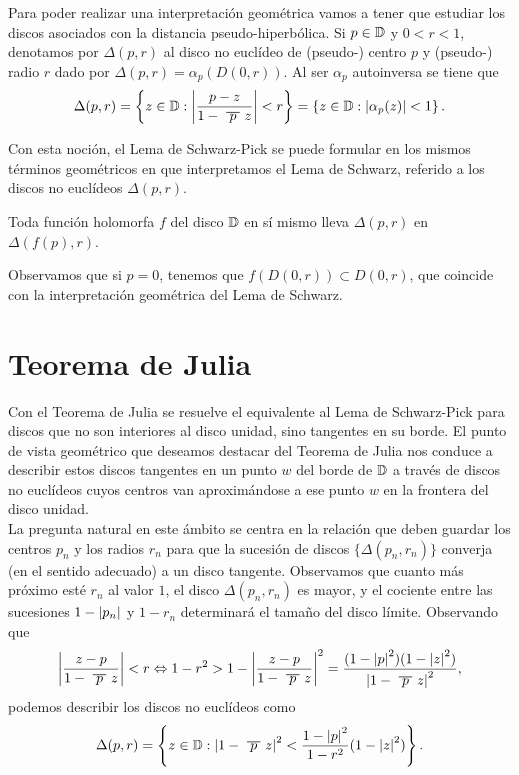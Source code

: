 Para poder realizar una interpretación geométrica vamos a tener que estudiar los discos asociados con la distancia pseudo-hiperbólica. Si $p \in \mathbb{D}$ y $0 < r < 1$, denotamos por $\Delta(p,r)$ al disco no euclídeo de (pseudo-) centro $p$ y (pseudo-) radio $r$ dado por $\Delta(p,r) = \alpha_p(D(0,r))$. Al ser $\alpha_p$ autoinversa se tiene que
\begin{equation*}
    \Delta(p,r) = \left\{z \in \disk: \abs{\frac{p-z}{1 - \xbar{p}z}} < r\right\} = \left\{z \in \disk: \abs{\alpha_p(z)} < 1\right\}.
\end{equation*}

Con esta noción, el Lema de Schwarz-Pick se puede formular en los mismos términos geométricos en que interpretamos el Lema de Schwarz, referido a los discos no euclídeos $\Delta(p,r)$. \\

\begin{theorem}
    Toda función holomorfa $f$ del disco $\mathbb{D}$ en sí mismo lleva $\Delta(p,r)$ en $\Delta(f(p),r)$.
\end{theorem}

Observamos que si $p = 0$, tenemos que $f(D(0,r)) \subset D(0,r)$, que coincide con la interpretación geométrica del Lema de Schwarz. \\

\section{Teorema de Julia}

Con el Teorema de Julia se resuelve el equivalente al Lema de Schwarz-Pick para discos que no son interiores al disco unidad, sino tangentes en su borde. El punto de vista geométrico que deseamos destacar del Teorema de Julia nos conduce a describir estos discos tangentes en un punto $w$ del borde de $\mathbb{D}$ a través de discos no euclídeos cuyos centros van aproximándose a ese punto $w$ en la frontera del disco unidad. \\

La pregunta natural en este ámbito se centra en la relación que deben guardar los centros $p_n$ y los radios $r_n$ para que la sucesión de discos $\{\Delta(p_n, r_n)\}$ converja (en el sentido adecuado) a un disco tangente. Observamos que cuanto más próximo esté $r_n$ al valor $1$, el disco $\Delta(p_n, r_n)$ es mayor, y el cociente entre las sucesiones $1 - \left\lvert p_n\right\rvert$ y $1 - r_n$ determinará el tamaño del disco límite. Observando que
\begin{equation*}
    \abs{\frac{z-p}{1 - \xbar{p}z}} < r \Leftrightarrow 1 - r^2 > 1 -  \abs{\frac{z-p}{1 - \xbar{p}z}}^2 = \frac{(1-\abs{p}^2)(1-\abs{z}^2)}{\abs{1-\xbar{p}z}^2},
\end{equation*}
podemos describir los discos no euclídeos como
\begin{equation*}
\Delta(p,r) = \left\{z \in \disk : \abs{1-\xbar{p}z}^2 < \frac{1-\abs{p}^2}{1-r^2} (1-\abs{z}^2)\right\}.
\end{equation*}


